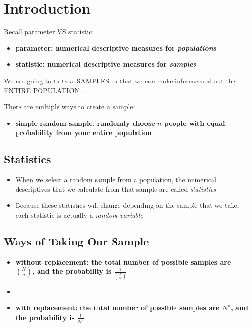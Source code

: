 \section{Introduction}

Recall parameter VS statistic:

\begin{itemize}
    \item \bf{parameter:} numerical descriptive measures for \it{populations}
    \item \bf{statistic:} numerical descriptive measures for \it{samples}
\end{itemize}

We are going to to take SAMPLES so that we can make inferences about the ENTIRE POPULATION.

There are multiple ways to create a sample:

\begin{itemize}
    \item \bf{simple random sample:} randomly choose $n$ people with equal probability from your entire population
\end{itemize}


\subsection{Statistics}

\begin{itemize}
    \item When we select a random sample from a population, the numerical descriptives that we calculate from that sample are called \it{statistics}
    \item Because these statistics will change depending on the sample that we take, each statistic is actually a \it{random variable}
\end{itemize}


\subsection{Ways of Taking Our Sample}

\begin{itemize}
    \item \bf{without replacement:} the total number of possible samples are $\binom{N}{n}$, and the probability is $\frac{1}{\binom{N}{n}}$
    \item \item \bf{with replacement:} the total number of possible samples are $N^n$, and the probability is $\frac{1}{N^n}$
\end{itemize}